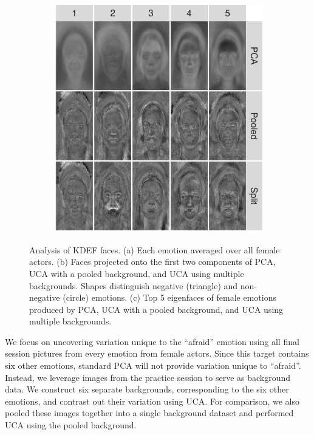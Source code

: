 \documentclass[12pt]{article}
\begin{document}
\begin{figure}[th!]
\begin{subfigure}{.49\linewidth}
    \includegraphics[width=\textwidth]{figure/all_Afraid_removed.png}
    \caption{}
   \label{fig:faces-eigenfaces}
    \end{subfigure}
    \caption{Analysis of KDEF faces. (a) Each emotion averaged over all female actors. (b) Faces projected onto the first two components of PCA, UCA with a pooled background, and UCA using multiple backgrounds. Shapes distinguish negative (triangle) and non-negative (circle) emotions. (c) Top 5 eigenfaces of female emotions produced by PCA, UCA with a pooled background, and UCA using multiple backgrounds.}
\end{figure}

We focus on uncovering variation unique to the ``afraid'' emotion using all final session pictures from every emotion from female actors. Since this target contains six other emotions, standard PCA will not provide variation unique to ``afraid''. Instead, we leverage images from the practice session to serve as background data. We construct six separate backgrounds, corresponding to the six other emotions, and contrast out their variation using UCA. For comparison, we also pooled these images together into a single background dataset and performed UCA using the pooled background.
\end{document}
